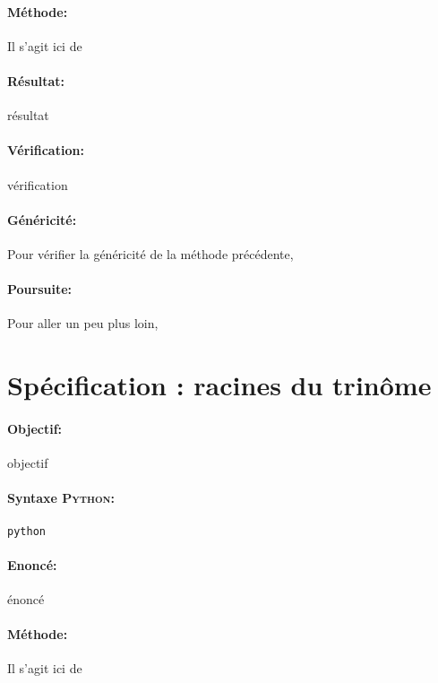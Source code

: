 \documentclass[11pt,a4paper,colorlinks,breaklinks]{article}
\def\python{\textsc{Python}}
\begin{document}
\paragraph{Méthode:} Il s'agit ici de 

\paragraph{Résultat:} résultat

\paragraph{Vérification:} vérification

\paragraph{Généricité:} Pour vérifier la généricité de la méthode précédente,

\paragraph{Poursuite:} Pour aller un peu plus loin,


\newpage
\section{Spécification : racines du trinôme}\label{maths:specification}
\paragraph{Objectif:} objectif

\paragraph{Syntaxe \python:} \texttt{python}

\begin{framed}
\paragraph{Enoncé:} énoncé
\end{framed}

\paragraph{Méthode:} Il s'agit ici de 
\end{document}
